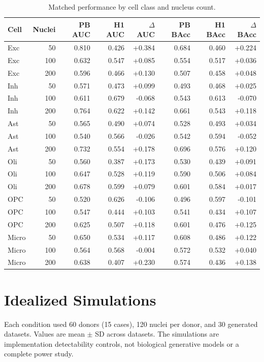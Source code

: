 \documentclass[9pt]{article}
\begin{document}
\begin{table}[ht]
\centering
\scriptsize
\caption{Matched performance by cell class and nucleus count.}
\begin{tabular}{lrrrrrrr}
\toprule
Cell & Nuclei & PB AUC & H1 AUC & $\Delta$AUC & PB BAcc & H1 BAcc & $\Delta$BAcc \\
\midrule
Exc & 50 & 0.810 & 0.426 & +0.384 & 0.684 & 0.460 & +0.224 \\
Exc & 100 & 0.632 & 0.547 & +0.085 & 0.554 & 0.517 & +0.036 \\
Exc & 200 & 0.596 & 0.466 & +0.130 & 0.507 & 0.458 & +0.048 \\
Inh & 50 & 0.571 & 0.473 & +0.099 & 0.493 & 0.468 & +0.025 \\
Inh & 100 & 0.611 & 0.679 & -0.068 & 0.543 & 0.613 & -0.070 \\
Inh & 200 & 0.764 & 0.622 & +0.142 & 0.661 & 0.543 & +0.118 \\
Ast & 50 & 0.565 & 0.490 & +0.074 & 0.528 & 0.493 & +0.034 \\
Ast & 100 & 0.540 & 0.566 & -0.026 & 0.542 & 0.594 & -0.052 \\
Ast & 200 & 0.732 & 0.554 & +0.178 & 0.696 & 0.576 & +0.120 \\
Oli & 50 & 0.560 & 0.387 & +0.173 & 0.530 & 0.439 & +0.091 \\
Oli & 100 & 0.647 & 0.528 & +0.119 & 0.590 & 0.506 & +0.084 \\
Oli & 200 & 0.678 & 0.599 & +0.079 & 0.601 & 0.584 & +0.017 \\
OPC & 50 & 0.520 & 0.626 & -0.106 & 0.496 & 0.597 & -0.101 \\
OPC & 100 & 0.547 & 0.444 & +0.103 & 0.541 & 0.434 & +0.107 \\
OPC & 200 & 0.625 & 0.507 & +0.118 & 0.601 & 0.476 & +0.125 \\
Micro & 50 & 0.650 & 0.534 & +0.117 & 0.608 & 0.486 & +0.122 \\
Micro & 100 & 0.564 & 0.568 & -0.004 & 0.572 & 0.532 & +0.040 \\
Micro & 200 & 0.638 & 0.407 & +0.230 & 0.574 & 0.436 & +0.138 \\
\bottomrule
\end{tabular}
\end{table}

\section{Idealized Simulations}
Each condition used 60 donors (15 cases), 120 nuclei per donor, and 30 generated datasets. Values are mean $\pm$ SD across datasets. The simulations are implementation detectability controls, not biological generative models or a complete power study.
\end{document}
